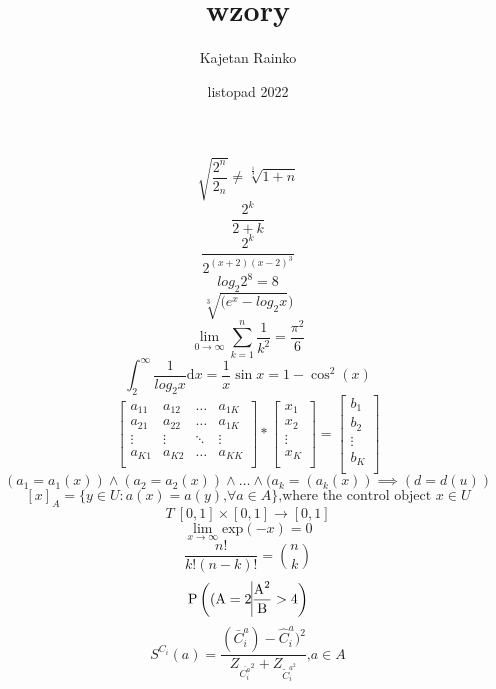 \documentclass[12pt; a4paper; titlepage]{article}
\title{wzory}
\author{Kajetan Rainko}
\date {listopad 2022}
\begin{document}
$$ \sqrt{ \frac{2^{n}}{2_n}}\neq \sqrt[\frac{1}{3}]{1+n} $$
\newline
$$ \frac{2^{k}}{2+k}$$
\newline
$$ \frac{2^{k}}{2^{(x+2)(x-2)^{3}}}$$
\newline
$$ log_2 2^{8}=8$$
\newline
$$\sqrt[3]{(e^{x}-log_2 x})$$
\newline
$$\lim_{0\to\infty} \sum_{k=1}^{n}\frac{1}{k^2}=\frac{\pi^2}{6}$$
\newline 
$$ \int^{\infty}_{2} \frac{1}{log_{2}x}\mathrm{d}x = \frac{1}{x}\sin x=1-\cos^{2} (x) $$ 
\newline
$$
\left[ \begin{array}{cccc}
a_{11} & a_{12} & \ldots & a_{1K}\\
a_{21} & a_{22} & \ldots & a_{1K}\\
\vdots & \vdots & \ddots & \vdots\\
a_{K1} & a_{K2} & \ldots & a_{KK}\\
\end{array} \right] * 
\left[ \begin{array}{c}
x_{1} \\
x_{2} \\
\vdots \\
x_{K} \\
\end{array} \right] = 
\left[ \begin{array}{c}
b_{1} \\
b_{2} \\
\vdots \\
b_{K} \\
\end{array} \right] $$
\newline
$$(a_{1}=a_{1}(x)) \land (a_{2}=a_{2}(x))\land \ldots \land	(a_{k}=(a_{k}(x)) \implies (d=d(u))$$
\newline
$$ [x]_{A}= \{ y\in U : a(x) = a (y)\textrm{,} \forall a \in A\}\textrm{,where the control object } x\in U$$ 
\newline
$$ T\:[0,1] \times [0,1] \to [0,1]$$
\newline
$$\lim_{x\to\infty} \textrm{exp}(-x)=0$$
\newline
$$\frac{n!}{k!(n-k)!}= {n \choose k}$$
\newline
$$ \textrm{P} \left(( \textrm{A} = 2 \vline \frac{\textrm{A}^2}{\textrm{B}}>4 \right)$$
\newline
$$ S^{C_{i}}(a)=\frac{(\bar{C}^{a}_{i})-\hat{C}^{a}_{i})^2}{Z_{\bar{C^{a}_{i}}^2}+Z_{\tilde{C}^{a^2}_{i}}}\textrm{,} a\in A$$
\end{document}
